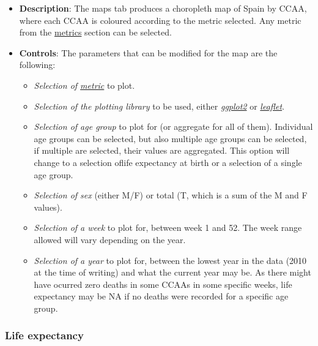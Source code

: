 \documentclass[
  a4paper]{article}
\providecommand{\tightlist}{%
  \setlength{\itemsep}{0pt}\setlength{\parskip}{0pt}}
\begin{document}
\begin{itemize}
\item
  \textbf{Description}: The maps tab produces a choropleth map of Spain
  by CCAA, where each CCAA is coloured according to the metric selected.
  Any metric from the \protect\hyperlink{Metrics}{metrics} section can
  be selected.
\item
  \textbf{Controls}: The parameters that can be modified for the map are
  the following:

  \begin{itemize}
  \tightlist
  \item
    \emph{Selection of \protect\hyperlink{Metrics}{metric}} to plot.
  \item
    \emph{Selection of the plotting library} to be used, either
    \href{https://ggplot2.tidyverse.org/}{\emph{ggplot2}} or
    \href{https://rstudio.github.io/leaflet/}{\emph{leaflet}}.
  \item
    \emph{Selection of age group} to plot for (or aggregate for all of
    them). Individual age groups can be selected, but also multiple age
    groups can be selected, if multiple are selected, their values are
    aggregated. This option will change to a selection oflife expectancy
    at birth or a selection of a single age group.
  \item
    \emph{Selection of sex} (either M/F) or total (T, which is a sum of
    the M and F values).
  \item
    \emph{Selection of a week} to plot for, between week 1 and 52. The
    week range allowed will vary depending on the year.
  \item
    \emph{Selection of a year} to plot for, between the lowest year in
    the data (2010 at the time of writing) and what the current year may
    be. As there might have ocurred zero deaths in some CCAAs in some
    specific weeks, life expectancy may be NA if no deaths were recorded
    for a specific age group.
  \end{itemize}
\end{itemize}

\hypertarget{LifeExpLayout}{%
\subsubsection{Life expectancy}\label{LifeExpLayout}}
\end{document}
